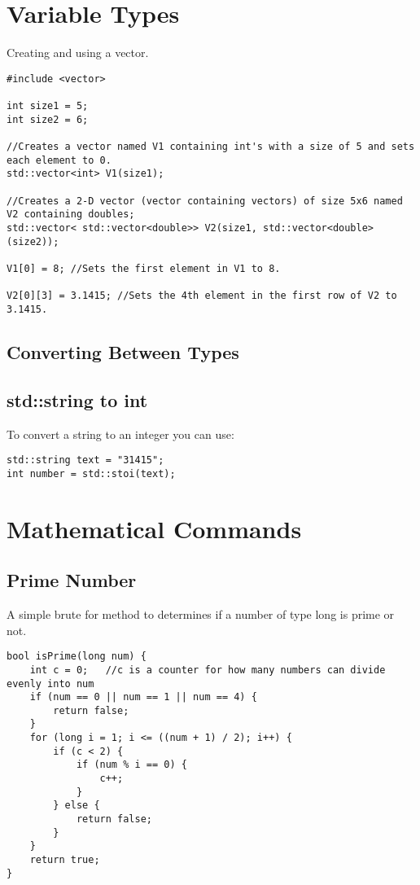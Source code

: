 \section{Variable Types}

Creating and using a vector.
\begin{lstlisting}
#include <vector>

int size1 = 5;
int size2 = 6;

//Creates a vector named V1 containing int's with a size of 5 and sets each element to 0. 
std::vector<int> V1(size1); 

//Creates a 2-D vector (vector containing vectors) of size 5x6 named V2 containing doubles;
std::vector< std::vector<double>> V2(size1, std::vector<double>(size2)); 

V1[0] = 8; //Sets the first element in V1 to 8.

V2[0][3] = 3.1415; //Sets the 4th element in the first row of V2 to 3.1415.

\end{lstlisting}


\subsection{Converting Between Types}

\subsection*{std::string to int}
To convert a string to an integer you can use:
\begin{lstlisting}
std::string text = "31415";
int number = std::stoi(text);
\end{lstlisting}

\section{Mathematical Commands}

\subsection*{Prime Number}
A simple brute for method to determines if a number of type long is prime or not.
\begin{lstlisting}
bool isPrime(long num) {  
	int c = 0;   //c is a counter for how many numbers can divide evenly into num
	if (num == 0 || num == 1 || num == 4) {
		return false;
	}
	for (long i = 1; i <= ((num + 1) / 2); i++) {
		if (c < 2) {
			if (num % i == 0) {
				c++;
			}
		} else {
			return false;
		}
	}
	return true;
}
\end{lstlisting}

